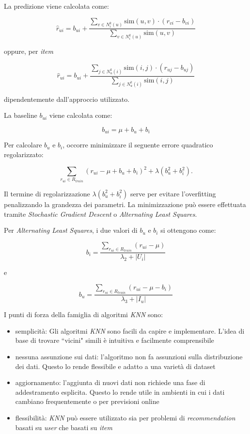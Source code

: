La predizione viene calcolata come:

\[
\hat{r}_{ui} = b_{ui} + \frac{\sum\limits_{v \in N^k_i(u)} \text{sim}(u, v) \cdot (r_{vi} - b_{vi})}{\sum\limits_{v \in N^k_i(u)} \text{sim}(u, v)}
\]

oppure, per \textit{item}

\[
\hat{r}_{ui} = b_{ui} + \frac{\sum\limits_{j \in N^k_u(i)} \text{sim}(i, j) \cdot (r_{uj} - b_{uj})}{\sum\limits_{j \in N^k_u(i)} \text{sim}(i, j)}
\]

dipendentemente dall'approccio utilizzato.

La baseline $b_{ui}$ viene calcolata come:

\[
b_{ui} = \mu + b_u + b_i
\]

Per calcolare $b_u$ e $b_i$, occorre minimizzare il seguente errore quadratico regolarizzato:

\[
\sum\limits_{r_{ui} \in R_{train}} \left(r_{ui} - \mu + b_u + b_i\right)^2 + \lambda \left(b_u^2 + b_i^2 \right).
\]

Il termine di regolarizzazione $\lambda \left(b_u^2 + b_i^2 \right)$ serve per evitare l'overfitting penalizzando la grandezza dei parametri. La minimizzazione può essere effettuata tramite \textit{Stochastic Gradient Descent} o \textit{Alternating Least Squares}.

Per \textit{Alternating Least Squares}, i due valori di $b_u$ e $b_i$ si ottengono come:

\[
b_i = \frac{\sum\limits_{r_{ui} \in R_{train}} (r_{ui} - \mu)}{\lambda_2 + |U_i|}
\]

e

\[
b_u = \frac{\sum\limits_{r_{ui} \in R_{train}} (r_{ui} - \mu - b_i)}{\lambda_3 + |I_u|}
\]

I punti di forza della famiglia di algoritmi \textit{KNN} sono:
\begin{itemize}
    \item semplicità: Gli algoritmi \textit{KNN} sono facili da capire e implementare. L'idea di base di trovare ``vicini" simili è intuitiva e facilmente comprensibile
    \item nessuna assunzione sui dati: l'algoritmo non fa assunzioni sulla distribuzione dei dati. Questo lo rende flessibile e adatto a una varietà di dataset
    \item aggiornamento: l'aggiunta di nuovi dati non richiede una fase di addestramento esplicita. Questo lo rende utile in ambienti in cui i dati cambiano frequentemente o per previsioni online
    \item flessibilità: \textit{KNN} può essere utilizzato sia per problemi di \textit{recommendation} basati su \textit{user} che basati su \textit{item}
\end{itemize}

